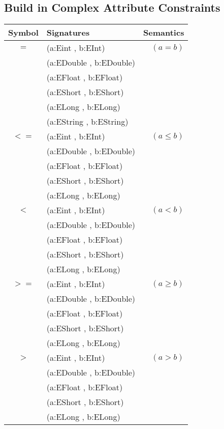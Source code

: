 \subsection{Build in Complex Attribute Constraints}  
\begin{table}[h]
\begin{center}
\begin{tabular}{| c| l | r |} \hline 
Symbol & Signatures  & Semantics \\ \hline \hline 
$=$ & (a:Eint , b:EInt) & $(a=b)$ \\ 
 & (a:EDouble , b:EDouble) & \\ 
 & (a:EFloat , b:EFloat) &  \\ 
 & (a:EShort , b:EShort) & \\ 
 & (a:ELong , b:ELong) &  \\ 
 & (a:EString , b:EString) & \\\hline
 $<=$ & (a:Eint , b:EInt) & $(a\leq b)$ \\ 
 & (a:EDouble , b:EDouble) & \\ 
 & (a:EFloat , b:EFloat) &  \\ 
 & (a:EShort , b:EShort) & \\ 
 & (a:ELong , b:ELong) &  \\\hline
 $<$ & (a:Eint , b:EInt) & $(a < b)$ \\ 
 & (a:EDouble , b:EDouble) & \\ 
 & (a:EFloat , b:EFloat) &  \\ 
 & (a:EShort , b:EShort) & \\ 
 & (a:ELong , b:ELong) &  \\\hline
 $>=$ & (a:Eint , b:EInt) & $(a\geq b)$ \\ 
 & (a:EDouble , b:EDouble) & \\ 
 & (a:EFloat , b:EFloat) &  \\ 
 & (a:EShort , b:EShort) & \\ 
 & (a:ELong , b:ELong) &  \\\hline
 $>$ & (a:Eint , b:EInt) & $(a > b)$ \\ 
 & (a:EDouble , b:EDouble) & \\ 
 & (a:EFloat , b:EFloat) &  \\ 
 & (a:EShort , b:EShort) & \\ 
 & (a:ELong , b:ELong) &  \\\hline
  \end{tabular}
  \end{center}
 \end{table} 
